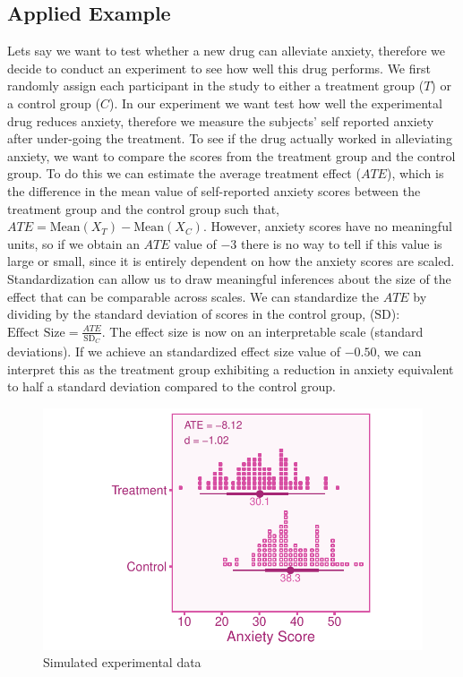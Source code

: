 \documentclass[
  letterpaper,
  DIV=11,
  numbers=noendperiod]{scrreprt}
\begin{document}
\hypertarget{applied-example}{%
\subsection{Applied Example}\label{applied-example}}

Lets say we want to test whether a new drug can alleviate anxiety,
therefore we decide to conduct an experiment to see how well this drug
performs. We first randomly assign each participant in the study to
either a treatment group (\(T\)) or a control group (\(C\)). In our
experiment we want test how well the experimental drug reduces anxiety,
therefore we measure the subjects' self reported anxiety after
under-going the treatment. To see if the drug actually worked in
alleviating anxiety, we want to compare the scores from the treatment
group and the control group. To do this we can estimate the average
treatment effect (\(ATE\)), which is the difference in the mean value of
self-reported anxiety scores between the treatment group and the control
group such that, \(ATE = \text{Mean}(X_T) - \text{Mean}(X_C)\). However,
anxiety scores have no meaningful units, so if we obtain an \(ATE\)
value of \(-3\) there is no way to tell if this value is large or small,
since it is entirely dependent on how the anxiety scores are scaled.
Standardization can allow us to draw meaningful inferences about the
size of the effect that can be comparable across scales. We can
standardize the \(ATE\) by dividing by the standard deviation of scores
in the control group, (\(\text{SD}\)):
\(\text{Effect Size} = \frac{ATE}{\text{SD}_C}\). The effect size is now
on an interpretable scale (standard deviations). If we achieve an
standardized effect size value of \(-0.50\), we can interpret this as
the treatment group exhibiting a reduction in anxiety equivalent to half
a standard deviation compared to the control group.

\begin{figure}

{\centering \includegraphics{intro_files/figure-pdf/unnamed-chunk-1-1.pdf}

}

\caption{Simulated experimental data}

\end{figure}
\end{document}
